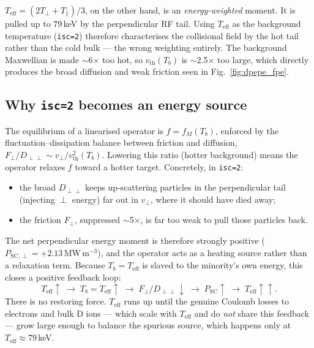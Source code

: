 \documentclass[11pt,a4paper]{article}
\begin{document}
$T_\text{eff} = (2T_\perp + T_\parallel)/3$, on the other hand, is an
\emph{energy-weighted} moment. It is pulled up to $79$\,keV by the
perpendicular RF tail. Using $T_\text{eff}$ as the background temperature
(\texttt{isc=2}) therefore characterises the collisional field by the hot
tail rather than the cold bulk --- the wrong weighting entirely. The
background Maxwellian is made $\sim$6$\times$ too hot, so
$v_\text{th}(T_b)$ is $\sim$2.5$\times$ too large, which directly produces the
broad diffusion and weak friction seen in Fig.~\ref{fig:dpepe_fpe}.

\subsection{Why \texttt{isc=2} becomes an energy source}

The equilibrium of a linearised operator is $f = f_M(T_b)$, enforced by the
fluctuation--dissipation balance between friction and diffusion,
$F_\perp / D_{\perp\perp} \sim v_\perp / v_\text{th}^2(T_b)$. Lowering this
ratio (hotter background) means the operator relaxes $f$ toward a hotter
target. Concretely, in \texttt{isc=2}:
\begin{itemize}
  \item the broad $D_{\perp\perp}$ keeps up-scattering particles in the
        perpendicular tail (injecting $\perp$ energy) far out in $v_\perp$,
        where it should have died away;
  \item the friction $F_\perp$, suppressed $\sim$5$\times$, is far too weak to
        pull those particles back.
\end{itemize}
The net perpendicular energy moment is therefore strongly positive
($P_{\mathrm{SC},\perp} = +2.13$\,MW\,m$^{-3}$), and the operator acts as a
heating source rather than a relaxation term. Because $T_b = T_\text{eff}$ is
slaved to the minority's own energy, this closes a positive feedback loop:
\begin{equation*}
  T_\text{eff}\uparrow
  \;\longrightarrow\; T_b = T_\text{eff}\uparrow
  \;\longrightarrow\; F_\perp/D_{\perp\perp}\downarrow
  \;\longrightarrow\; P_\text{SC}\uparrow
  \;\longrightarrow\; T_\text{eff}\uparrow\uparrow.
\end{equation*}
There is no restoring force. $T_\text{eff}$ runs up until the genuine Coulomb
losses to electrons and bulk D ions --- which scale with $T_\text{eff}$ and do
\emph{not} share this feedback --- grow large enough to balance the spurious
source, which happens only at $T_\text{eff} \approx 79$\,keV.
\end{document}
